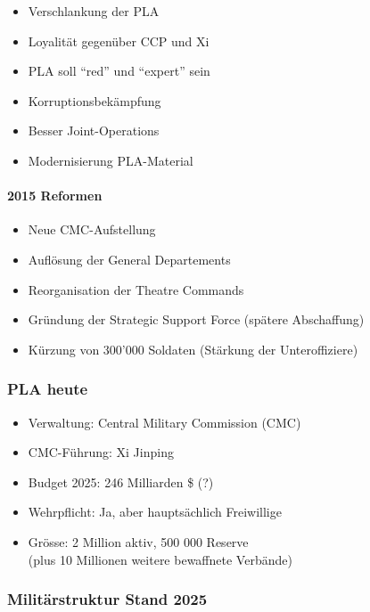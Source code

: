 {}\documentclass[a4paper]{article}
\providecommand{\tightlist}{\setlength{\itemsep}{1mm}\setlength{\parskip}{1mm}}
\begin{document}
\begin{itemize}
	\tightlist
	\item
	      Verschlankung der PLA
	\item
	      Loyalität gegenüber CCP und Xi
	\item
	      PLA soll ``red'' und ``expert'' sein
	\item
	      Korruptionsbekämpfung
	\item
	      Besser Joint-Operations
	\item
	      Modernisierung PLA-Material
\end{itemize}

\paragraph{2015 Reformen}\label{reformen}

\begin{itemize}
	\tightlist
	\item
	      Neue CMC-Aufstellung
	\item
	      Auflösung der General Departements
	\item
	      Reorganisation der Theatre Commands
	\item
	      Gründung der Strategic Support Force (spätere Abschaffung)
	\item
	      Kürzung von 300'000 Soldaten (Stärkung der Unteroffiziere)
\end{itemize}

\subsubsection{PLA heute}\label{pla-heute}

\begin{itemize}
	\tightlist
	\item
	      Verwaltung: Central Military Commission (CMC)
	\item
	      CMC-Führung: Xi Jinping
	\item
	      Budget 2025: 246 Milliarden \$ (?)
	\item
	      Wehrpflicht: Ja, aber hauptsächlich Freiwillige
	\item
	      Grösse: 2 Million aktiv, 500 000 Reserve\\
	      (plus 10 Millionen weitere bewaffnete Verbände)
\end{itemize}

\subsubsection{Militärstruktur Stand
	2025}\label{milituxe4rstruktur-stand-2025}
\end{document}
